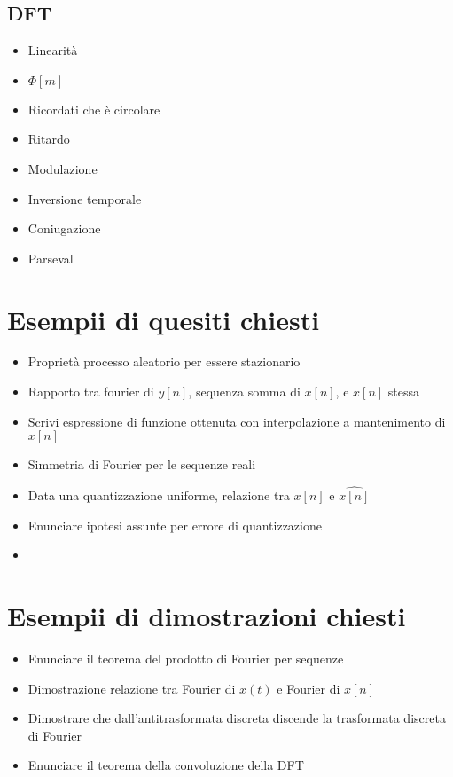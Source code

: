 \documentclass[11pt]{article}
\begin{document}
\subsection{DFT}
\label{sec:orgba6c988}
\begin{itemize}
\item Linearità
\item \(\Phi [m]\)
\item Ricordati che è circolare
\item Ritardo
\item Modulazione
\item Inversione temporale
\item Coniugazione
\item Parseval
\end{itemize}

\section{Esempii di quesiti chiesti}
\label{sec:org1291aa3}
\begin{itemize}
\item Proprietà processo aleatorio per essere stazionario
\item Rapporto tra fourier di \(y[n]\), sequenza somma di \(x[n]\), e
\(x[n]\) stessa
\item Scrivi espressione di funzione ottenuta con interpolazione a
mantenimento di \(x[n]\)
\item Simmetria di Fourier per le sequenze reali
\item Data una quantizzazione uniforme, relazione tra \(x[n]\) e
\(\hat{x[n]}\)
\item Enunciare ipotesi assunte per errore di quantizzazione
\item{}
\end{itemize}

\section{Esempii di dimostrazioni chiesti}
\label{sec:org4090b56}
\begin{itemize}
\item Enunciare il teorema del prodotto di Fourier per sequenze
\item Dimostrazione relazione tra Fourier di \(x(t)\) e Fourier di
\(x[n]\)
\item Dimostrare che dall'antitrasformata discreta discende la
trasformata discreta di Fourier
\item Enunciare il teorema della convoluzione della DFT
\end{itemize}
\end{document}

